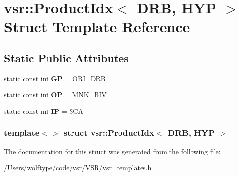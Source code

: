 \hypertarget{structvsr_1_1_product_idx_3_01_d_r_b_00_01_h_y_p_01_4}{\section{vsr\-:\-:Product\-Idx$<$ D\-R\-B, H\-Y\-P $>$ Struct Template Reference}
\label{structvsr_1_1_product_idx_3_01_d_r_b_00_01_h_y_p_01_4}
}
\subsection*{Static Public Attributes}
\begin{DoxyCompactItemize}
\item 
\hypertarget{structvsr_1_1_product_idx_3_01_d_r_b_00_01_h_y_p_01_4_ae63cf583c2d9d61d0bbb3a2bdaca09bc}{static const int {\bfseries G\-P} = O\-R\-I\-\_\-\-D\-R\-B}\label{structvsr_1_1_product_idx_3_01_d_r_b_00_01_h_y_p_01_4_ae63cf583c2d9d61d0bbb3a2bdaca09bc}

\item 
\hypertarget{structvsr_1_1_product_idx_3_01_d_r_b_00_01_h_y_p_01_4_a976c5bf3f52aec96e9214e802130c724}{static const int {\bfseries O\-P} = M\-N\-K\-\_\-\-B\-I\-V}\label{structvsr_1_1_product_idx_3_01_d_r_b_00_01_h_y_p_01_4_a976c5bf3f52aec96e9214e802130c724}

\item 
\hypertarget{structvsr_1_1_product_idx_3_01_d_r_b_00_01_h_y_p_01_4_a98bb86bafb0a494da64019a9a4645914}{static const int {\bfseries I\-P} = S\-C\-A}\label{structvsr_1_1_product_idx_3_01_d_r_b_00_01_h_y_p_01_4_a98bb86bafb0a494da64019a9a4645914}

\end{DoxyCompactItemize}
\subsubsection*{template$<$$>$ struct vsr\-::\-Product\-Idx$<$ D\-R\-B, H\-Y\-P $>$}



The documentation for this struct was generated from the following file\-:\begin{DoxyCompactItemize}
\item 
/\-Users/wolftype/code/vsr/\-V\-S\-R/vsr\-\_\-templates.\-h\end{DoxyCompactItemize}
